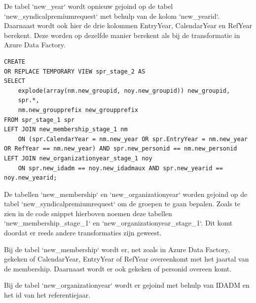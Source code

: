 De tabel `new\_year` wordt opnieuw gejoind op de tabel `new\_syndicalpremiumrequest` met behulp van de kolom `new\_yearid`. Daarnaast wordt ook hier de drie kolommen EntryYear, CalendarYear en RefYear berekent. Deze worden op dezelfde manier berekent als bij de transformatie in Azure Data Factory.


\begin{verbatim}
CREATE
OR REPLACE TEMPORARY VIEW spr_stage_2 AS
SELECT 
    explode(array(nm.new_groupid, noy.new_groupid)) new_groupid,
    spr.*,
    nm.new_groupprefix new_groupprefix
FROM spr_stage_1 spr
LEFT JOIN new_membership_stage_1 nm 
    ON (spr.CalendarYear = nm.new_year OR spr.EntryYear = nm.new_year OR RefYear == nm.new_year) AND spr.new_personid == nm.new_personid 
LEFT JOIN new_organizationyear_stage_1 noy 
    ON spr.new_idadm == noy.new_idadmaux AND spr.new_yearid == noy.new_yearid;
\end{verbatim}

De tabellen `new\_membership` en `new\_organizationyear` worden gejoind op de tabel `new\_syndicalpremiumrequest` om de groepen te gaan bepalen. Zoals te zien in de code snippet hierboven noemen deze tabellen `new\_membership\_stage\_1` en `new\_organizationyear\_stage\_1`. Dit komt doordat er reeds andere transformaties zijn geweest.

Bij de tabel `new\_membership` wordt er, net zoals in Azure Data Factory, gekeken of CalendarYear, EntryYear of RefYear overeenkomt met het jaartal van de membership. Daarnaast wordt er ook gekeken of personid overeen komt. 

Bij de tabel `new\_organizationyear` wordt er gejoind met behulp van IDADM en het id van het referentiejaar.

